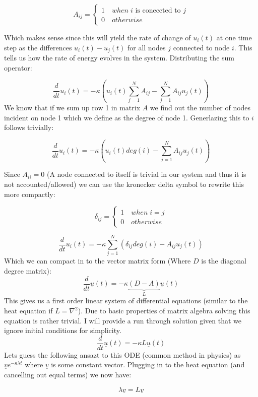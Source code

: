\documentclass[10pt,twocolumn]{article}
\begin{document}
\[ A_{ij} = \begin{cases} 
   1 \quad when \; i \text{ is coneccted to } j \\
   0 \quad otherwise 
   \end{cases}
\]

Which makes sense since this will yield the rate of change of $u_{i}(t)$ at one time step as the differences $u_{i}(t) - u_{j}(t)$ for all nodes $j$ connected to node $i$. This tells us how the rate of energy evolves in the system.
\newline
Distributing the sum operator:

\[
\frac{d}{dt}u_{i}(t) = -\kappa \left( u_{i}(t) \sum_{j=1}^{N}A_{ij}-  \sum_{j=1}^{N}A_{ij}u_{j}(t) \right )
\]
We know that if we sum up row 1 in matrix $A$ we find out the number of nodes incident on node 1 which we define as the degree of node 1. Generlazing this to $i$ follows trivially:

\[
\frac{d}{dt}u_{i}(t) = -\kappa \left( u_{i}(t) deg(i)-  \sum_{j=1}^{N}A_{ij}u_{j}(t) \right )
\]

Since $A_{ii}=0$  (A node connected to itself is trivial in our system and thus it is not accounted/allowed) we can use the kronecker delta symbol to rewrite this more compactly:

\[ \delta_{ij} = \begin{cases} 
   1 \quad when \; i = j \\
   0 \quad otherwise 
   \end{cases}
\]

\[
\frac{d}{dt}u_{i}(t) = -\kappa \sum_{j=1}^{N}(\delta_{ij} deg(i) -A_{ij}u_{j}(t))
\]
Which we can compact in to the vector matrix form (Where $D$ is the diagonal degree matrix):
\[
\frac{d}{dt}\underline{u}(t) = -\kappa\underbrace{(D -A)}_{L}\underline{u}(t)
\]
This gives us a first order linear system of differential equations (similar to the heat equation if $L = \nabla^{2}$). Due to basic properties of matrix algebra solving this equation is rather trivial. I will provide a run through solution given that we ignore initial conditions for simplicity.
\[
\frac{d}{dt}\underline{u}(t) = -\kappa L\underline{u}(t)
\]
Lets guess the following ansazt to this ODE (common method in physics) as $\underline{v}e^{-\kappa\lambda t}$ where $\underline{v}$ is some constant vector. Plugging in to the heat equation (and cancelling out equal terms) we now have:

\[
 \lambda \underline{v} = L \underline{v}
\]
\end{document}
